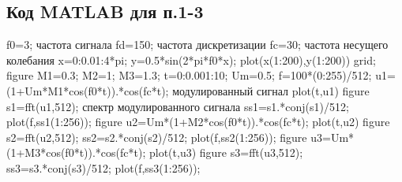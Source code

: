 \documentclass[10pt,a4paper]{article}
\begin{document}
\subsection{Код MATLAB для п.1-3}
f0=3; частота сигнала \newline
fd=150; частота дискретизации\newline
fc=30; частота несущего колебания\newline
x=0:0.01:4*pi;\newline
y=0.5*sin(2*pi*f0*x);\newline
plot(x(1:200),y(1:200))\newline
grid;\newline
figure\newline
M1=0.3; \newline
M2=1;\newline
M3=1.3;\newline
t=0:0.001:10;\newline
Um=0.5;\newline
f=100*(0:255)/512;\newline
u1=(1+Um*M1*cos(f0*t)).*cos(fc*t); модулированный сигнал\newline
plot(t,u1)\newline
figure\newline
s1=fft(u1,512); спектр модулированного сигнала\newline
ss1=s1.*conj(s1)/512;\newline
plot(f,ss1(1:256));\newline
figure\newline
u2=Um*(1+M2*cos(f0*t)).*cos(fc*t);\newline
plot(t,u2)\newline
figure\newline
s2=fft(u2,512);\newline
ss2=s2.*conj(s2)/512;\newline
plot(f,ss2(1:256));\newline
figure\newline
u3=Um*(1+M3*cos(f0*t)).*cos(fc*t);\newline
plot(t,u3)\newline
figure\newline
s3=fft(u3,512);\newline
ss3=s3.*conj(s3)/512;\newline
plot(f,ss3(1:256));\newline
\end{document}
